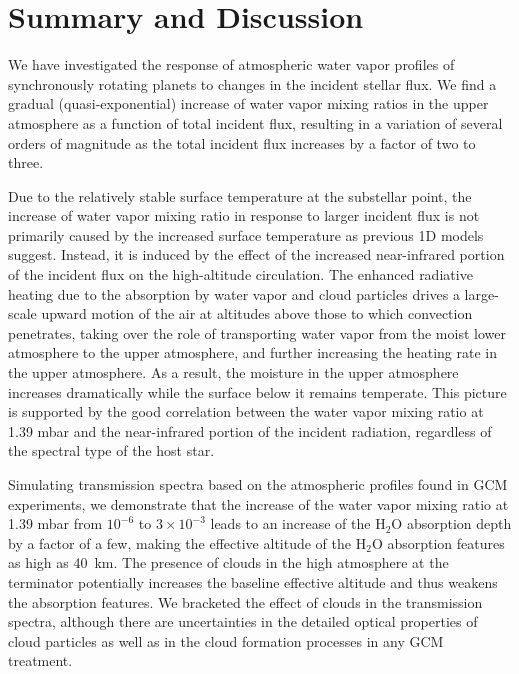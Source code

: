 \documentclass[11pt,numberedappendix,twocolappendix,]{emulateapj}
\def\water{H$_2$O}
\def\preslevel{1.39 mbar}
\def\wv{water vapor}
\begin{document}
\section{Summary and Discussion}
\label{s:summary}

We have investigated the response of atmospheric \wv{} profiles of synchronously rotating planets to changes in the incident stellar flux. 
We find a gradual (quasi-exponential) increase of \wv{} mixing ratios in the upper atmosphere as a function of total incident flux, resulting in a variation of several orders of magnitude as the total incident flux increases by a factor of two to three. 

Due to the relatively stable surface temperature at the substellar point, the increase of \wv{} mixing ratio in response to larger incident flux is not primarily caused by the increased surface temperature as previous 1D models suggest. 
Instead, it is induced by the effect of the increased near-infrared portion of the incident flux on the high-altitude circulation. 
The enhanced radiative heating due to the absorption by \wv{} and cloud particles drives a large-scale upward motion of the air at altitudes above those to which convection penetrates, taking over the role of transporting \wv{} from the moist lower atmosphere to the upper atmosphere, and further increasing the heating rate in the upper atmosphere.
As a result, the moisture in the upper atmosphere increases dramatically while the surface below it remains temperate. 
This picture is supported by the good correlation between the \wv{} mixing ratio at \preslevel{} and the near-infrared portion of the incident radiation, regardless of the spectral type of the host star. 

Simulating transmission spectra based on the atmospheric profiles found in GCM experiments, 
we demonstrate that the increase of the \wv{} mixing ratio at \preslevel{} from $10^{-6}$ to $3 \times 10^{-3}$ leads to an increase of the \water{} absorption depth by a factor of a few, making the effective altitude of the \water{} absorption features as high as 40~km. 
The presence of clouds in the high atmosphere at the terminator potentially increases the baseline effective altitude and thus weakens the absorption features. 
We bracketed the effect of clouds in the transmission spectra, 
although there are uncertainties in the detailed optical properties of cloud particles as well as in the cloud formation processes in any GCM treatment. 
\end{document}
